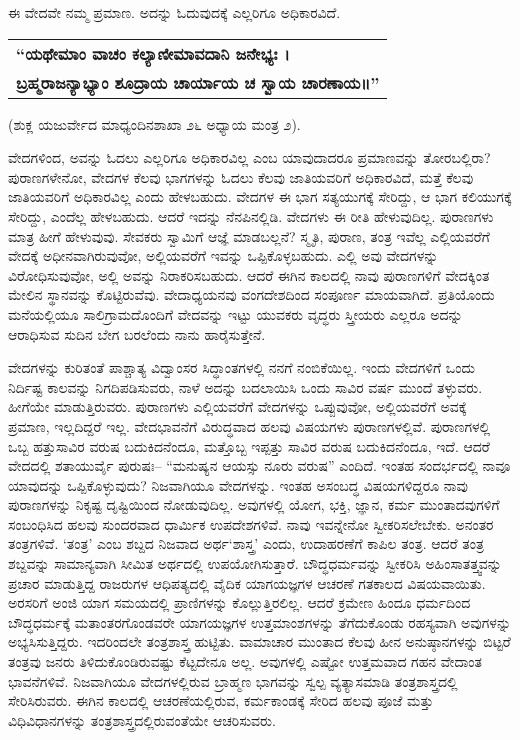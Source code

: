 ಈ ವೇದವೇ ನಮ್ಮ ಪ್ರಮಾಣ. ಅದನ್ನು ಓದುವುದಕ್ಕೆ ಎಲ್ಲರಿಗೂ ಅಧಿಕಾರವಿದೆ. 

\smallskip

\begin{longtable}{@{\hspace{-10pt}}l@{}}
\textbf{“ಯಥೇಮಾಂ ವಾಚಂ ಕಲ್ಯಾಣೀಮಾವದಾನಿ ಜನೇಭ್ಯಃ ।} \\
\textbf{ಬ್ರಹ್ಮರಾಜನ್ಯಾಭ್ಯಾಂ ಶೂದ್ರಾಯ ಚಾರ್ಯಾಯ ಚ ಸ್ವಾಯ ಚಾರಣಾಯ॥”} \\
\end{longtable}

\hfill (ಶುಕ್ಲ ಯಜುರ್ವೇದ ಮಾಧ್ಯಂದಿನಶಾಖಾ ೨೬ ಅಧ್ಯಾಯ ಮಂತ್ರ ೨). 

\smallskip

ವೇದಗಳಿಂದ, ಅವನ್ನು ಓದಲು ಎಲ್ಲರಿಗೂ ಅಧಿಕಾರವಿಲ್ಲ ಎಂಬ ಯಾವುದಾದರೂ ಪ್ರಮಾಣವನ್ನು ತೋರಬಲ್ಲಿರಾ? ಪುರಾಣಗಳೇನೋ, ವೇದಗಳ ಕೆಲವು ಭಾಗಗಳನ್ನು ಓದಲು ಕೆಲವು ಜಾತಿಯವರಿಗೆ ಅಧಿಕಾರವಿದೆ, ಮತ್ತೆ ಕೆಲವು ಜಾತಿಯವರಿಗೆ ಅಧಿಕಾರವಿಲ್ಲ ಎಂದು ಹೇಳಬಹುದು. ವೇದಗಳ ಈ ಭಾಗ ಸತ್ಯಯುಗಕ್ಕೆ ಸೇರಿದ್ದು, ಆ ಭಾಗ ಕಲಿಯುಗಕ್ಕೆ ಸೇರಿದ್ದು, ಎಂದೆಲ್ಲ ಹೇಳಬಹುದು. ಆದರೆ ಇದನ್ನು ನೆನಪಿನಲ್ಲಿಡಿ. ವೇದಗಳು ಈ ರೀತಿ ಹೇಳುವುದಿಲ್ಲ. ಪುರಾಣಗಳು ಮಾತ್ರ ಹೀಗೆ ಹೇಳುವುವು. ಸೇವಕರು ಸ್ವಾಮಿಗೆ ಆಜ್ಞೆ ಮಾಡಬಲ್ಲನೆ? ಸ್ಮೃತಿ, ಪುರಾಣ, ತಂತ್ರ ಇವೆಲ್ಲ ಎಲ್ಲಿಯವರೆಗೆ ವೇದಕ್ಕೆ ಅಧೀನವಾಗಿರುವುವೋ, ಅಲ್ಲಿಯವರೆಗೆ ಇವನ್ನು ಒಪ್ಪಿಕೊಳ್ಳಬಹುದು. ಎಲ್ಲಿ ಅವು ವೇದಗಳನ್ನು ವಿರೋಧಿಸುವುವೋ, ಅಲ್ಲಿ ಅವನ್ನು ನಿರಾಕರಿಸಬಹುದು. ಆದರೆ ಈಗಿನ ಕಾಲದಲ್ಲಿ ನಾವು ಪುರಾಣಗಳಿಗೆ ವೇದಕ್ಕಿಂತ ಮೇಲಿನ ಸ್ಥಾನವನ್ನು ಕೊಟ್ಟಿರುವೆವು. ವೇದಾಧ್ಯಯನವು ವಂಗದೇಶದಿಂದ ಸಂಪೂರ್ಣ ಮಾಯವಾಗಿದೆ. ಪ್ರತಿಯೊಂದು ಮನೆಯಲ್ಲಿಯೂ ಸಾಲಿಗ್ರಾಮದೊಂದಿಗೆ ವೇದವನ್ನು ಇಟ್ಟು ಯುವಕರು ವೃದ್ಧರು ಸ್ತ್ರೀಯರು ಎಲ್ಲರೂ ಅದನ್ನು ಆರಾಧಿಸುವ ಸುದಿನ ಬೇಗ ಬರಲೆಂದು ನಾನು ಹಾರೈಸುತ್ತೇನೆ. 

ವೇದಗಳನ್ನು ಕುರಿತಂತೆ ಪಾಶ್ಚಾತ್ಯ ವಿದ್ವಾಂಸರ ಸಿದ್ಧಾಂತಗಳಲ್ಲಿ ನನಗೆ ನಂಬಿಕೆಯಿಲ್ಲ. ಇಂದು ವೇದಗಳಿಗೆ ಒಂದು ನಿರ್ದಿಷ್ಟ ಕಾಲವನ್ನು ನಿಗದಿಪಡಿಸುವರು, ನಾಳೆ ಅದನ್ನು ಬದಲಾಯಿಸಿ ಒಂದು ಸಾವಿರ ವರ್ಷ ಮುಂದೆ ತಳ್ಳುವರು. ಹೀಗೆಯೇ ಮಾಡುತ್ತಿರುವರು. ಪುರಾಣಗಳು ಎಲ್ಲಿಯವರೆಗೆ ವೇದಗಳನ್ನು ಒಪ್ಪುವುವೋ, ಅಲ್ಲಿಯವರೆಗೆ ಅವಕ್ಕೆ ಪ್ರಮಾಣ, ಇಲ್ಲದಿದ್ದರೆ ಇಲ್ಲ. ವೇದಭಾವನೆಗೆ ವಿರುದ್ಧವಾದ ಹಲವು ವಿಷಯಗಳು ಪುರಾಣಗಳಲ್ಲಿವೆ. ಪುರಾಣಗಳಲ್ಲಿ ಒಬ್ಬ ಹತ್ತುಸಾವಿರ ವರುಷ ಬದುಕಿದನೆಂದೂ, ಮತ್ತೊಬ್ಬ ಇಪ್ಪತ್ತು ಸಾವಿರ ವರುಷ ಬದುಕಿದನೆಂದೂ, ಇದೆ. ಆದರೆ ವೇದದಲ್ಲಿ ಶತಾಯುರ್ವೈ ಪುರುಷಃ– “ಮನುಷ್ಯನ ಆಯಸ್ಸು ನೂರು ವರುಷ” ಎಂದಿದೆ. ಇಂತಹ ಸಂದರ್ಭದಲ್ಲಿ ನಾವೂ ಯಾವುದನ್ನು ಒಪ್ಪಿಕೊಳ್ಳುವುದು? ನಿಜವಾಗಿಯೂ ವೇದಗಳನ್ನು. ಇಂತಹ ಅಸಂಬದ್ಧ ವಿಷಯಗಳಿದ್ದರೂ ನಾವು ಪುರಾಣಗಳನ್ನು ನಿಕೃಷ್ಟ ದೃಷ್ಟಿಯಿಂದ ನೋಡುವುದಿಲ್ಲ. ಅವುಗಳಲ್ಲಿ ಯೋಗ, ಭಕ್ತಿ, ಜ್ಞಾನ, ಕರ್ಮ ಮುಂತಾದವುಗಳಿಗೆ ಸಂಬಂಧಿಸಿದ ಹಲವು ಸುಂದರವಾದ ಧಾರ್ಮಿಕ ಉಪದೇಶಗಳಿವೆ. ನಾವು ಇವನ್ನೇನೋ ಸ್ವೀಕರಿಸಲೇಬೇಕು. ಅನಂತರ ತಂತ್ರಗಳಿವೆ. ‘ತಂತ್ರ’ ಎಂಬ ಶಬ್ದದ ನಿಜವಾದ ಅರ್ಥ‘ಶಾಸ್ತ್ರ’ ಎಂದು, ಉದಾಹರಣೆಗೆ ಕಾಪಿಲ ತಂತ್ರ. ಆದರೆ ತಂತ್ರ ಶಬ್ದವನ್ನು ಸಾಮಾನ್ಯವಾಗಿ ಸೀಮಿತ ಅರ್ಥದಲ್ಲಿ ಉಪಯೋಗಿಸುತ್ತಾರೆ. ಬೌದ್ಧಧರ್ಮವನ್ನು ಸ್ವೀಕರಿಸಿ ಅಹಿಂಸಾತತ್ತ್ವವನ್ನು ಪ್ರಚಾರ ಮಾಡುತ್ತಿದ್ದ ರಾಜರುಗಳ ಆಧಿಪತ್ಯದಲ್ಲಿ ವೈದಿಕ ಯಾಗಯಜ್ಞಗಳ ಆಚರಣೆ ಗತಕಾಲದ ವಿಷಯವಾಯಿತು. ಅರಸರಿಗೆ ಅಂಜಿ ಯಾಗ ಸಮಯದಲ್ಲಿ ಪ್ರಾಣಿಗಳನ್ನು ಕೊಲ್ಲುತ್ತಿರಲಿಲ್ಲ. ಆದರೆ ಕ್ರಮೇಣ ಹಿಂದೂ ಧರ್ಮದಿಂದ ಬೌದ್ಧಧರ್ಮಕ್ಕೆ ಮತಾಂತರಗೊಂಡವರೇ ಯಾಗಯಜ್ಞಗಳ ಉತ್ತಮಾಂಶಗಳನ್ನು ತೆಗೆದುಕೊಂಡು ರಹಸ್ಯವಾಗಿ ಅವುಗಳನ್ನು ಅಭ್ಯಸಿಸುತ್ತಿದ್ದರು. ಇದರಿಂದಲೇ ತಂತ್ರಶಾಸ್ತ್ರ ಹುಟ್ಟಿತು. ವಾಮಾಚಾರ ಮುಂತಾದ ಕೆಲವು ಹೀನ ಅನುಷ್ಠಾನಗಳನ್ನು ಬಿಟ್ಟರೆ ತಂತ್ರವು ಜನರು ತಿಳಿದುಕೊಂಡಿರುವಷ್ಟು ಕೆಟ್ಟದೇನೂ ಅಲ್ಲ. ಅವುಗಳಲ್ಲಿ ಎಷ್ಟೋ ಉತ್ತಮವಾದ ಗಹನ ವೇದಾಂತ ಭಾವನೆಗಳಿವೆ. ನಿಜವಾಗಿಯೂ ವೇದಗಳಲ್ಲಿರುವ ಬ್ರಾಹ್ಮಣ ಭಾಗವನ್ನು ಸ್ವಲ್ಪ ವ್ಯತ್ಯಾಸಮಾಡಿ ತಂತ್ರಶಾಸ್ತ್ರದಲ್ಲಿ ಸೇರಿಸಿರುವರು. ಈಗಿನ ಕಾಲದಲ್ಲಿ ಆಚರಣೆಯಲ್ಲಿರುವ, ಕರ್ಮಕಾಂಡಕ್ಕೆ ಸೇರಿದ ಹಲವು ಪೂಜೆ ಮತ್ತು ವಿಧಿವಿಧಾನಗಳನ್ನು ತಂತ್ರಶಾಸ್ತ್ರದಲ್ಲಿರುವಂತೆಯೇ ಆಚರಿಸುವರು. 

